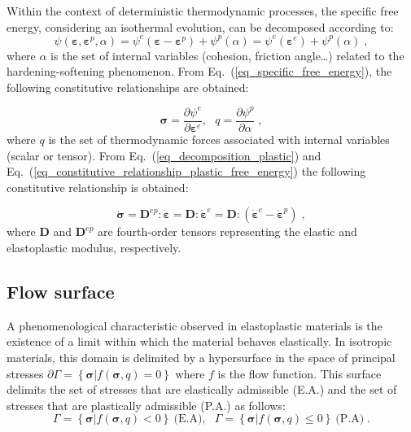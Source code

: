 \documentclass[Journal,letterpaper]{ascelike-new}
\newcommand{\Dsdee}{\boldsymbol{D}}
\newcommand{\Dsdep}{\boldsymbol{D}^{ep}}
\newcommand{\dstrain}{\boldsymbol{\dot{\varepsilon}}}
\newcommand{\dstraine}{\boldsymbol{\dot{\varepsilon}}^{e}}
\newcommand{\dstrainp}{\boldsymbol{\dot{\varepsilon}}^{p}}
\newcommand{\dstress}{\boldsymbol{\dot{\sigma}}}
\newcommand{\strain}{\boldsymbol{\varepsilon}}
\newcommand{\straine}{\boldsymbol{\varepsilon}^{e}}
\newcommand{\strainp}{\boldsymbol{\varepsilon}^{p}}
\newcommand{\stress}{\boldsymbol{\sigma}}
\begin{document}
Within the context of deterministic thermodynamic processes, the specific free energy, considering an isothermal evolution, can be decomposed according to:
\begin{equation} \label{eq_specific_free_energy}
    \psi(\strain,\strainp,\alpha) = \psi^e(\strain-\strainp)+\psi^p(\alpha) = \psi^e(\strain^e)+\psi^p(\alpha)\;,
\end{equation}
where $\alpha$ is the set of internal variables (cohesion, friction angle…) related to the hardening-softening phenomenon. From Eq.~(\ref{eq_specific_free_energy}), the following constitutive relationships are obtained:

\begin{equation} \label{eq_constitutive_relationship_plastic_free_energy}
    \stress = \dfrac{\partial \psi^e}{\partial \straine}, ~~~ q = \dfrac{\partial \psi^p}{\partial \alpha}\;,
\end{equation}
where $q$ is the set of thermodynamic forces associated with internal variables (scalar or tensor). From Eq.~(\ref{eq_decomposition_plastic}) and Eq.~(\ref{eq_constitutive_relationship_plastic_free_energy}) the following constitutive relationship is obtained:

\begin{equation} \label{eq_constitutive_relationship_plastic}
    \dstress = \Dsdep : \dstrain = \Dsdee : \dstraine = \Dsdee : (\dstraine - \dstrainp)\;,
\end{equation}
where $\Dsdee$  and $\Dsdep$ are fourth-order tensors representing the elastic and elastoplastic modulus, respectively.

\subsection{Flow surface}

A phenomenological characteristic observed in elastoplastic
materials is the existence of a limit within which the material behaves elastically. In isotropic materials, this domain is delimited by a hypersurface in the space of principal stresses $\partial \Gamma = \left\{ \stress | f(\stress,q) = 0 \right\}$ where $f$ is the flow function. This surface delimits the set of stresses that are elastically admissible (E.A.) and the set of stresses that are plastically admissible (P.A.) as follows:
\begin{equation} \label{eq_PA_domain}
    \Gamma = \left\{ \stress | f(\stress,q) < 0 \right\}~\text{(E.A)}, ~~~ \Gamma = \left\{ \stress | f(\stress,q) \leq 0 \right\}~\text{(P.A)}\;.
\end{equation}
\end{document}
